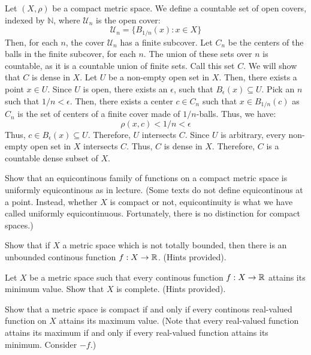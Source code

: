 \documentclass[12pt]{article}
\begin{document}
\begin{solu}
    Let $(X, \rho)$ be a compact metric space. We define a countable set of open covers, indexed by $\mathbb{N}$, where $\mathcal{U}_n$ is the open cover: 
    \[ \mathcal{U}_n = \{ B_{1/n}(x) : x \in X\} \] 
    Then, for each $n$, the cover $\mathcal{U}_n$ has a finite subcover. Let $C_n$ be the centers of the balls in the finite subcover, for each $n$. The union of these sets over $n$ is countable, as it is a countable union of finite sets. Call this set $C$. We will show that $C$ is dense in $X$. \bbni
    Let $U$ be a non-empty open set in $X$. Then, there exists a point $x \in U$. Since $U$ is open, there exists an $\epsilon$, such that $B_\epsilon(x) \subseteq U$. Pick an $n$ such that $1/n < \epsilon$. Then, there exists a center $c \in C_n$ such that $x \in B_{1/n}(c)$ as $C_n$ is the set of centers of a finite cover made of $1/n$-balls. Thus, we have:
    \[\rho(x, c) < 1/n < \epsilon\]
    Thus, $c \in B_\epsilon(x) \subseteq U$. Therefore, $U$ intersects $C$. Since $U$ is arbitrary, every non-empty open set in $X$ intersects $C$. Thus, $C$ is dense in $X$. Therefore, $C$ is a countable dense subset of $X$.
\end{solu}
\newpage

\begin{problab}{5}
    Show that an equicontinous family of functions on a compact metric space is uniformly equicontinous as in lecture. (Some texts do not define equicontinous at a point. Instead, whether $X$ is compact or not, equicontinuity is what we have called uniformly equicontinuous. Fortunately, there is no distinction for compact spaces.)
\end{problab}

\begin{solu}

\end{solu}
\newpage 


\begin{problab}{6} 
    Show that if $X$ a metric space which is not totally bounded, then there is an unbounded continous function $f: X \to \mathbb R$. (Hints provided).
\end{problab}

\begin{solu}

\end{solu}
\newpage

\begin{problab}{7}
    Let $X$ be a metric space such that every continous function $f: X \to \mathbb R$ attains its minimum value. Show that $X$ is complete. (Hints provided).
\end{problab}

\begin{solu}

\end{solu}
\newpage

\begin{problab}{8}
    Show that a metric space is compact if and only if every continous real-valued function on $X$ attains its maximum value. (Note that every real-valued function attains its maximum if and only if every real-valued function attains its minimum. Consider $-f$.)
\end{problab}
\end{document}
